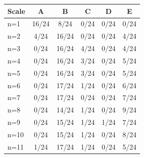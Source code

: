 \begin{tabular}{lccccc}
\toprule
Scale & \cellcolor[HTML]{FFFFFF} A & \cellcolor[HTML]{EA4646} B & \cellcolor[HTML]{9670BD} C & \cellcolor[HTML]{8FEB32} D & \cellcolor[HTML]{19C8C8} E \\
\midrule
n=1 & \cellcolor[HTML]{FFFFFF} 16/24 & \cellcolor[HTML]{EA4646} 8/24 & \cellcolor[HTML]{9670BD} 0/24 & \cellcolor[HTML]{8FEB32} 0/24 & \cellcolor[HTML]{19C8C8} 0/24 \\
n=2 & \cellcolor[HTML]{FFFFFF} 4/24 & \cellcolor[HTML]{EA4646} 16/24 & \cellcolor[HTML]{9670BD} 0/24 & \cellcolor[HTML]{8FEB32} 0/24 & \cellcolor[HTML]{19C8C8} 4/24 \\
n=3 & \cellcolor[HTML]{FFFFFF} 0/24 & \cellcolor[HTML]{EA4646} 16/24 & \cellcolor[HTML]{9670BD} 4/24 & \cellcolor[HTML]{8FEB32} 0/24 & \cellcolor[HTML]{19C8C8} 4/24 \\
n=4 & \cellcolor[HTML]{FFFFFF} 0/24 & \cellcolor[HTML]{EA4646} 16/24 & \cellcolor[HTML]{9670BD} 3/24 & \cellcolor[HTML]{8FEB32} 0/24 & \cellcolor[HTML]{19C8C8} 5/24 \\
n=5 & \cellcolor[HTML]{FFFFFF} 0/24 & \cellcolor[HTML]{EA4646} 16/24 & \cellcolor[HTML]{9670BD} 3/24 & \cellcolor[HTML]{8FEB32} 0/24 & \cellcolor[HTML]{19C8C8} 5/24 \\
n=6 & \cellcolor[HTML]{FFFFFF} 0/24 & \cellcolor[HTML]{EA4646} 17/24 & \cellcolor[HTML]{9670BD} 1/24 & \cellcolor[HTML]{8FEB32} 0/24 & \cellcolor[HTML]{19C8C8} 6/24 \\
n=7 & \cellcolor[HTML]{FFFFFF} 0/24 & \cellcolor[HTML]{EA4646} 17/24 & \cellcolor[HTML]{9670BD} 0/24 & \cellcolor[HTML]{8FEB32} 0/24 & \cellcolor[HTML]{19C8C8} 7/24 \\
n=8 & \cellcolor[HTML]{FFFFFF} 0/24 & \cellcolor[HTML]{EA4646} 14/24 & \cellcolor[HTML]{9670BD} 1/24 & \cellcolor[HTML]{8FEB32} 0/24 & \cellcolor[HTML]{19C8C8} 9/24 \\
n=9 & \cellcolor[HTML]{FFFFFF} 0/24 & \cellcolor[HTML]{EA4646} 15/24 & \cellcolor[HTML]{9670BD} 1/24 & \cellcolor[HTML]{8FEB32} 1/24 & \cellcolor[HTML]{19C8C8} 7/24 \\
n=10 & \cellcolor[HTML]{FFFFFF} 0/24 & \cellcolor[HTML]{EA4646} 15/24 & \cellcolor[HTML]{9670BD} 1/24 & \cellcolor[HTML]{8FEB32} 0/24 & \cellcolor[HTML]{19C8C8} 8/24 \\
n=11 & \cellcolor[HTML]{FFFFFF} 1/24 & \cellcolor[HTML]{EA4646} 17/24 & \cellcolor[HTML]{9670BD} 1/24 & \cellcolor[HTML]{8FEB32} 0/24 & \cellcolor[HTML]{19C8C8} 5/24 \\

\end{tabular}
